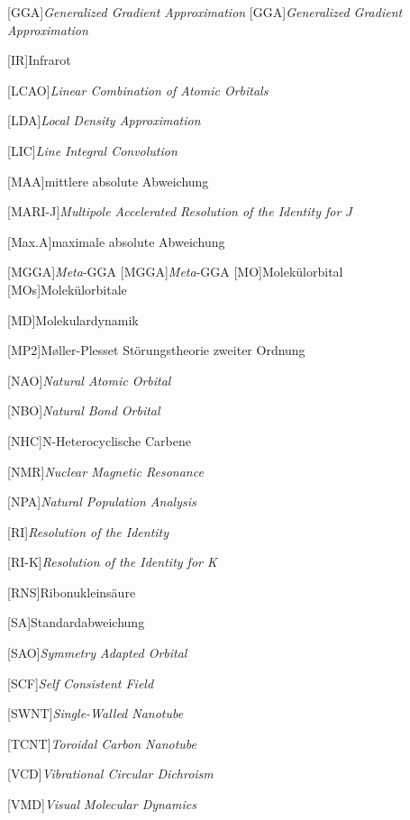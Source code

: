 \begin{acronym}[SEPSEP]
	[GGA]{\textit{Generalized Gradient Approximation}}   
		[GGA]{\textit{Generalized Gradient Approximation}}
	
	[IR]{Infrarot}
		
	[LCAO]{\textit{Linear Combination of Atomic Orbitals}}
	
	[LDA]{\textit{Local Density Approximation}}
	
	[LIC]{\textit{Line Integral Convolution}}
	
	[MAA]{mittlere absolute Abweichung}
     
    [MARI-J]{\textit{Multipole Accelerated Resolution of the Identity for $J$}}
    
    [Max.A]{maximale absolute Abweichung} 	
 	
	[MGGA]{\textit{Meta}-GGA}   
		{\textit{Meta}-GGA}	
	[MO]{Molekülorbital}   
		[MOs]{Molekülorbitale}
		
	[MD]{Molekulardynamik}
	
	[MP2]{M\o ller-Plesset Störungstheorie zweiter Ordnung}
		
    [NAO]{\textit{Natural Atomic Orbital}}

    [NBO]{\textit{Natural Bond Orbital}}
    
    [NHC]{N-Heterocyclische Carbene}
    
    [NMR]{\textit{Nuclear Magnetic Resonance}}
        
    [NPA]{\textit{Natural Population Analysis}}
      
    [RI]{\textit{Resolution of the Identity}}
    
    [RI-K]{\textit{Resolution of the Identity for K}}
    
    [RNS]{Ribonukleinsäure}
    
    [SA]{Standardabweichung}
    
    [SAO]{\textit{Symmetry Adapted Orbital}}
    
	[SCF]{\textit{Self Consistent Field}}  
	
	[SWNT]{\textit{Single-Walled Nanotube}}
		
	[TCNT]{\textit{Toroidal Carbon Nanotube}} 
		
	[VCD]{\textit{Vibrational Circular Dichroism}}
     
    [VMD]{\textit{Visual Molecular Dynamics}}
\end{acronym}